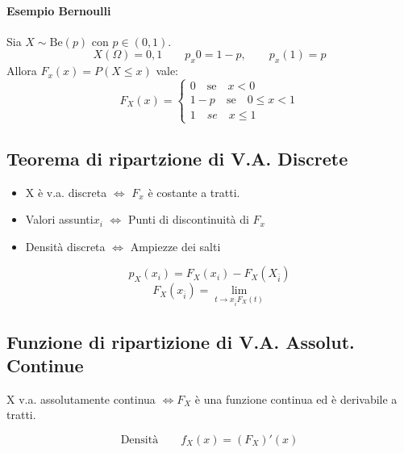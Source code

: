 \paragraph*{Esempio Bernoulli} Sia $X \sim \text{Be}(p)$ con $p \in (0,1)$.
\begin{equation*}
    X(\Omega) = {0, 1} \qquad p_x{0}=1-p, \qquad p_x(1) = p
\end{equation*}
Allora $F_x(x) = P(X \leq x)$ vale:
\begin{equation*}
    F_X(x) =
    \begin{cases}
        0 \quad \text{se} \quad x < 0 \\
        1-p \quad \text{se} \quad 0 \leq x < 1 \\
        1 \quad se \quad x \leq 1
    \end{cases}
\end{equation*}

\subsection*{Teorema di ripartzione di V.A. Discrete}
\begin{itemize}
    \item X è v.a. discreta $\Leftrightarrow$ $F_x$ è costante a tratti.
    \item Valori assunti{$x_i$} $\Leftrightarrow$ Punti di discontinuità  di $F_x$
    \item Densità discreta $\Leftrightarrow$ Ampiezze dei salti
\end{itemize}
\begin{equation*}
    p_X (x_i) = F_X(x_i) - F_X(X_{\bar{i}})
\end{equation*}
\begin{equation*}
    F_X(x_{\bar{i}}) = \lim_{t \to x_{\bar{i}} F_X(t)}  
\end{equation*}
\subsection*{Funzione di ripartizione di V.A. Assolut. Continue}
X v.a. assolutamente continua $\Leftrightarrow F_X$ è una funzione continua ed
è derivabile a tratti.

\begin{equation}
    \text{Densità} \qquad f_X(x) = (F_X)'(x)
\end{equation}

